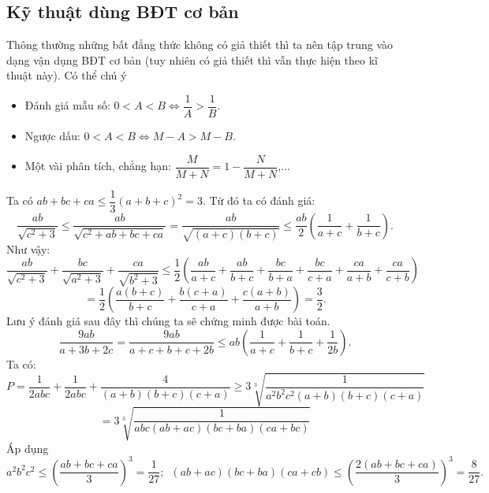 \subsection{Kỹ thuật dùng BĐT cơ bản}
Thông thường những bất đẳng thức không có giả thiết thì ta nên tập trung vào dạng vận dụng BĐT cơ bản (tuy nhiên có giả thiết thì vẫn thực hiện theo kĩ thuật này). Có thể chú ý
\begin{itemize}
\item Đánh giá mẫu số: $0<A<B\Leftrightarrow \dfrac{1}{A}>\dfrac{1}{B}$.
\item Ngược dấu: $0<A<B\Leftrightarrow M-A>M-B$.
\item Một vài phân tích, chẳng hạn: $\dfrac{M}{M+N}=1-\dfrac{N}{M+N}$,...
\end{itemize}
\hda  Ta có $ab+bc+ca\le \dfrac{1}{3}{{\left( a+b+c \right)}^{2}}=3$. Từ đó ta có đánh giá:
\[\frac{ab}{\sqrt{{{c}^{2}}+3}}\le \frac{ab}{\sqrt{{{c}^{2}}+ab+bc+ca}}=\frac{ab}{\sqrt{\left( a+c \right)\left( b+c \right)}}\le \frac{ab}{2}\left( \frac{1}{a+c}+\frac{1}{b+c} \right).\]
Như vậy: \[\frac{ab}{\sqrt{{{c}^{2}}+3}}+\frac{bc}{\sqrt{{{a}^{2}}+3}}+\frac{ca}{\sqrt{{{b}^{2}}+3}}\le \frac{1}{2}\left( \frac{ab}{a+c}+\frac{ab}{b+c}+\frac{bc}{b+a}+\frac{bc}{c+a}+\frac{ca}{a+b}+\frac{ca}{c+b} \right)\]
\[=\frac{1}{2}\left( \frac{a\left( b+c \right)}{b+c}+\frac{b\left( c+a \right)}{c+a}+\frac{c\left( a+b \right)}{a+b} \right)=\frac{3}{2}.\]
\hda  Lưu ý đánh giá sau đây thì chúng ta sẽ chứng minh được bài toán.
\[\frac{9ab}{a+3b+2c}=\frac{9ab}{a+c+b+c+2b}\le ab\left( \frac{1}{a+c}+\frac{1}{b+c}+\frac{1}{2b} \right).\]
\hda  Ta có: \[P=\frac{1}{2abc}+\frac{1}{2abc}+\frac{4}{\left( a+b \right)\left( b+c \right)\left( c+a \right)}\ge 3\sqrt[3]{\frac{1}{{{a}^{2}}{{b}^{2}}{{c}^{2}}\left( a+b \right)\left( b+c \right)\left( c+a \right)}}\]
\[=3\sqrt[3]{\frac{1}{abc\left( ab+ac \right)\left( bc+ba \right)\left( ca+bc \right)}}\]
Áp dụng \[{{a}^{2}}{{b}^{2}}{{c}^{2}}\le {{\left( \frac{ab+bc+ca}{3} \right)}^{3}}=\frac{1}{27};\,\,\,\left( ab+ac \right)\left( bc+ba \right)\left( ca+cb \right)\le {{\left( \frac{2\left( ab+bc+ca \right)}{3} \right)}^{3}}=\frac{8}{27}.\] 
